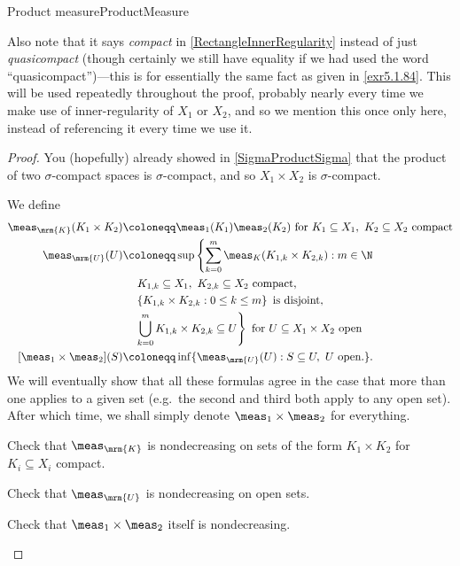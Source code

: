 \begin{thm}{Product measure}{ProductMeasure}
\begin{rmk}
\end{rmk}
\begin{rmk}
Also note that it says \emph{compact} in \eqref{RectangleInnerRegularity} instead of just \emph{quasicompact} (though certainly we still have equality if we had used the word ``quasicompact'')---this is for essentially the same fact as given in \cref{exr5.1.84}.  This will be used repeatedly throughout the proof, probably nearly every time we make use of inner-regularity of $X_1$ or $X_2$, and so we mention this once only here, instead of referencing it every time we use it.
\end{rmk}
\begin{proof}
You (hopefully) already showed in \cref{SigmaProductSigma} that the product of two $\sigma$-compact spaces is $\sigma$-compact, and so $X_1\times X_2$ is $\sigma$-compact.

We define
{\scriptsize
\begin{equation}\label{eqn5.2.3}
\begin{split}
\meas _{\mrm{K}}(K_1\times K_2) & \coloneqq \meas _1(K_1)\meas _2(K_2)\text{ for }K_1\subseteq X_1,\ K_2\subseteq X_2\text{ compact} \\
\meas _{\mrm{U}}(U) & \coloneqq \sup \left\{ \sum _{k=0}^m\meas _K(K_{1,k}\times K_{2,k}):m\in \N \right. \\
& \quad \left. K_{1,k}\subseteq X_1,\ K_{2,k}\subseteq X_2\text{ compact},\right. \\
& \quad \left. \left\{ K_{1,k}\times K_{2,k}:0\leq k\leq m\right\} \text{ is disjoint},\right. \\
& \quad \left. \bigcup _{k=0}^mK_{1,k}\times K_{2,k}\subseteq U\right\} \text{ for }U\subseteq X_1\times X_2\text{ open} \\
[\meas _1\times \meas _2](S) & \coloneqq \inf \{ \meas _{\mrm{U}}(U):S\subseteq U,\ U\text{ open.}\} .
\end{split}
\end{equation}
}
We will eventually show that all these formulas agree in the case that more than one applies to a given set (e.g.~the second and third both apply to any open set).  After which time, we shall simply denote $\meas _1\times \meas _2$ for everything.

\begin{exr}[breakable=false]{}{}
Check that $\meas _{\mrm{K}}$ is nondecreasing on sets of the form $K_1\times K_2$ for $K_i\subseteq X_i$ compact.
\end{exr}
\begin{exr}[breakable=false]{}{}
Check that $\meas _{\mrm{U}}$ is nondecreasing on open sets.
\end{exr}
\begin{exr}[breakable=false]{}{}
Check that $\meas _1\times \meas _2$ itself is nondecreasing.
\end{exr}


\end{proof}
\end{thm}
